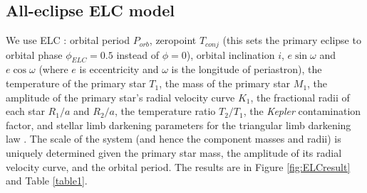 \subsection{All-eclipse ELC model}\label{all-eclipse}
We use ELC : orbital period $P_{orb}$, zeropoint $T_{conj}$ (this sets the primary eclipse to orbital phase $\phi_{ELC} = 0.5$ instead of $\phi = 0$), orbital inclination $i$, $e \sin \omega$ and $e \cos \omega$ (where $e$ is eccentricity and $\omega$ is the longitude of periastron), the temperature of the primary star $T_1$, the mass of the primary star $M_1$, the amplitude of the primary star's radial velocity curve $K_1$, the fractional radii of each star $R_1/a$ and $R_2/a$, the temperature ratio $T_2/T_1$, the \emph{Kepler} contamination factor, and stellar limb darkening parameters for the triangular limb darkening law \citep{kip13}. The scale of the system (and hence the component masses and radii) is uniquely determined given the primary star mass, the amplitude of its radial velocity curve, and the orbital period.  The results are in Figure \ref{fig:ELCresult} and Table \ref{table1}.

